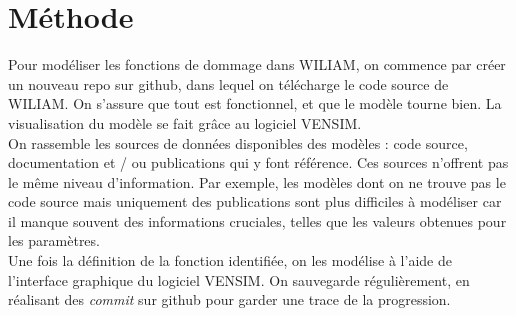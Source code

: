 \section{Méthode}

\begin{methodbox}

Pour modéliser les fonctions de dommage dans WILIAM, on commence par créer un nouveau repo sur github, dans lequel on télécharge le code source de WILIAM. On s'assure que tout est fonctionnel, et que le modèle tourne bien. La visualisation du modèle se fait grâce au logiciel VENSIM. \\

On rassemble les sources de données disponibles des modèles : code source, documentation et / ou publications qui y font référence. Ces sources n'offrent pas le même niveau d'information. Par exemple, les modèles dont on ne trouve pas le code source mais uniquement des publications sont plus difficiles à modéliser car il manque souvent des informations cruciales, telles que les valeurs obtenues pour les paramètres. \\

Une fois la définition de la fonction identifiée, on les modélise à l'aide de l'interface graphique du logiciel VENSIM. On sauvegarde régulièrement, en réalisant des \textit{commit} sur github pour garder une trace de la progression.
    
\end{methodbox}

